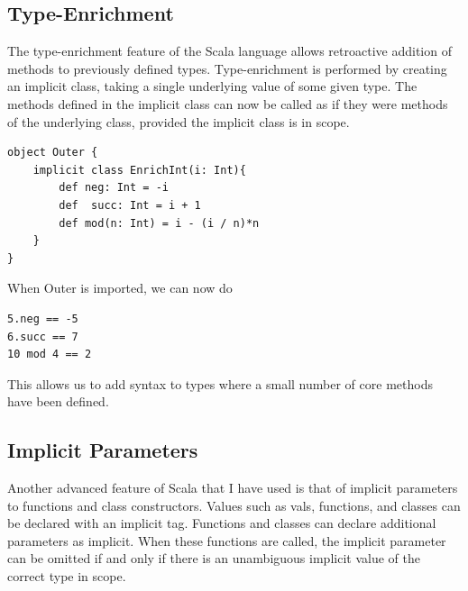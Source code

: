 \documentclass[12pt,a4paper,twoside,openright]{report}
\renewcommand{\baselinestretch}{1.1}    %
\begin{document}
\subsection{Type-Enrichment}
The type-enrichment feature of the Scala language allows retroactive addition of methods to previously defined types. Type-enrichment is performed by creating an implicit class, taking a single underlying value of some given type. The methods defined in the implicit class can now be called as if they were methods of the underlying class, provided the implicit class is in scope.

\renewcommand{\baselinestretch}{0.8}
\begin{framed}
\begin{framed}
\begin{verbatim}
object Outer {
    implicit class EnrichInt(i: Int){
        def neg: Int = -i
        def  succ: Int = i + 1
        def mod(n: Int) = i - (i / n)*n
    }
}
\end{verbatim}
\end{framed}
\renewcommand{\baselinestretch}{1.1}
When Outer is imported, we can now do

\renewcommand{\baselinestretch}{0.8}
\begin{framed}
\begin{verbatim}
5.neg == -5
6.succ == 7
10 mod 4 == 2
\end{verbatim}
\end{framed}
\end{framed}
\renewcommand{\baselinestretch}{1.1}






This allows us to add syntax to types where a small number of core methods have been defined.

\subsection{Implicit Parameters}
Another advanced feature of Scala that  I have used is that of implicit  parameters to functions and class constructors. Values such as vals, functions, and classes can be declared with an implicit tag. Functions and classes can declare additional parameters as implicit. When these functions are called, the implicit parameter can be omitted if and only if there is an unambiguous implicit value of the correct type in scope.
\end{document}
